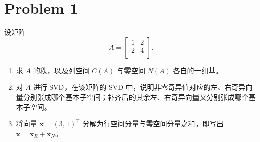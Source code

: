 \section*{Problem 1}

设矩阵
\[
A = \begin{bmatrix}
    1 & 2 \\
    2 & 4 \\
\end{bmatrix}.
\]
\begin{enumerate}
    \item 求 $A$ 的秩，以及列空间 $C \left(A\right)$ 与零空间 $N \left(A\right)$ 各自的一组基。
    \item 对 $A$ 进行 SVD，在该矩阵的 SVD 中，说明非零奇异值对应的左、右奇异向量分别张成哪个基本子空间；补齐后的其余左、右奇异向量又分别张成哪个基本子空间。
    \item 将向量 $\boldsymbol{x} = \left(3, 1\right)^\top$ 分解为行空间分量与零空间分量之和，即写出 $\boldsymbol{x} = \boldsymbol{x}_{R} + \boldsymbol{x}_{N}$。
\end{enumerate}

